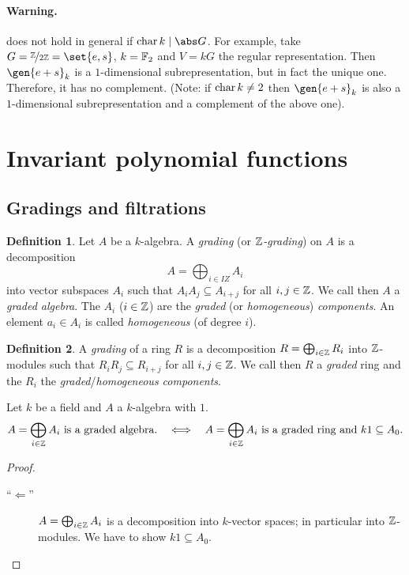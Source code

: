 \documentclass[12pt,a4paper]{scrartcl}
\theoremstyle{cplain}
\theoremstyle{cplain}
\theoremstyle{cplain}
\theoremstyle{definition}
\newtheorem*{deff}{Definition}
\begin{document}
\begin{otherlanguage}{english}
\paragraph{Warning.}
 does not hold in general if $\chr k \mid \abs G$. For example, take $G = \fak \IZ{2\IZ} = \set{e,s}$, $k = \mathbb F_2$ and $V = kG$ the regular representation. Then $\gen{e+s}_k$ is a $1$-dimensional subrepresentation, but in fact the unique one. Therefore, it has no complement. (Note: if $\operatorname{char} k \neq 2$ then $\gen{e+s}_k$ is also a $1$-dimensional subrepresentation and a complement of the above one).

\section{Invariant polynomial functions}

\subsection{Gradings and filtrations}
\begin{deff}
  Let $A$ be a $k$-algebra. A \emph{grading} (or \emph{$\mathbb Z$-grading}) on $A$ is a decomposition \[ A = \bigoplus_{i\in IZ} A_i\] into vector subspaces $A_i$ such that $A_iA_j \subseteq A_{i+j}$ for all $i,j\in \mathbb Z$. We call then $A$ a \emph{graded algebra}. The $A_i$ ($i \in \mathbb Z$) are the \emph{graded} (or \emph{homogeneous}) \emph{components}. An element $a_i \in A_i$ is called \emph{homogeneous} (of degree $i$).
\end{deff}
\begin{deff}
  A \emph{grading} of a ring $R$ is a decomposition $R = \bigoplus_{i \in \mathbb Z} R_i$ into $\mathbb Z$-modules such that $R_iR_j \subseteq R_{i+j}$ for all $i,j\in \mathbb Z$. We call then $R$ a \emph{graded} ring and the $R_i$ the \emph{graded}/\emph{homogeneous components}.
\end{deff}

\begin{lem}
  Let $k$ be a field and $A$ a $k$-algebra with $1$.
  \[ A = \bigoplus_{i \in \mathbb Z} A_i\text{ is a graded algebra.} \quad \Longleftrightarrow \quad A = \bigoplus_{i \in \mathbb Z} A_i \text{ is a graded ring and $k1 \subseteq A_0$.} \]
\end{lem}
\begin{proof}
  \leavevmode
  \begin{description}
    \item[\enquote{$\Leftarrow$}] $A= \bigoplus _{ i\in\mathbb Z}A_i$ is a decomposition into $k$-vector spaces; in particular into $\mathbb Z$-modules. We have to show $k1 \subseteq A_0$.
    

\end{description}
\end{proof}
\end{otherlanguage}
\end{document}
